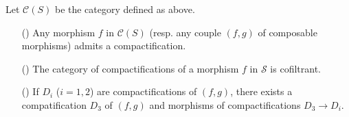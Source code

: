 \begin{proposition}\label{scheme morphism compactification prop}
Let $\mathcal{C}(S)$ be the category defined as above.
\begin{enumerate}
    \item[(\rmnum{1})] Any morphism $f$ in $\mathcal{C}(S)$ (resp. any couple $(f,g)$ of composable morphisms) admits a compactification.
    \item[(\rmnum{2})] The category of compactifications of a morphism $f$ in $\mathcal{S}$ is cofiltrant.
    \item[(\rmnum{3})] If $D_i$ ($i=1,2$) are compactifications of $(f,g)$, there exists a compatification $D_3$ of $(f,g)$ and morphisms of compactifications $D_3\to D_i$. 
\end{enumerate}
\end{proposition}
